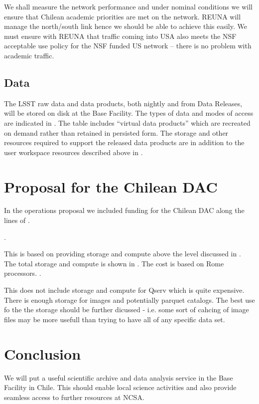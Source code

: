 We shall measure the network performance and under nominal conditions we will ensure that Chilean academic priorities are met on the network.
REUNA will manage the north/south link hence we should be able to achieve this easily.
We must ensure with REUNA that traffic coming into USA also meets the NSF acceptable use policy for the NSF funded US network -- there is no problem with academic traffic.


\subsection{Data}
\label{sec:data}

The LSST raw data and data products, both nightly and from Data Releases, will be stored on disk at the Base Facility.
The types of data and modes of access are indicated in .
The table includes ``virtual data products'' which are recreated on demand rather than retained in persisted form.
The storage and other resources required to support the released data products are in addition to the user workspace resources described above in .




\section{Proposal for the Chilean DAC}\label{sec:prop}

In the operations proposal  we included funding for the Chilean DAC along the lines of .

.

This is based on providing storage and compute above the level discussed in .
The total storage and compute is shown in . The cost is based on Rome processors.
.

This does not include storage and compute for Qserv which is quite expensive. There is enough storage for images and potentially parquet catalogs. The best use fo the the storage should be further dicussed - i.e. some sort of cahcing of image files may be more usefull than trying to have all of any specific data set.




\section{Conclusion}

We will put a useful scientific archive and data analysis service in the Base Facility in Chile.
This should enable local science activities and also provide seamless access to further resources at NCSA.
